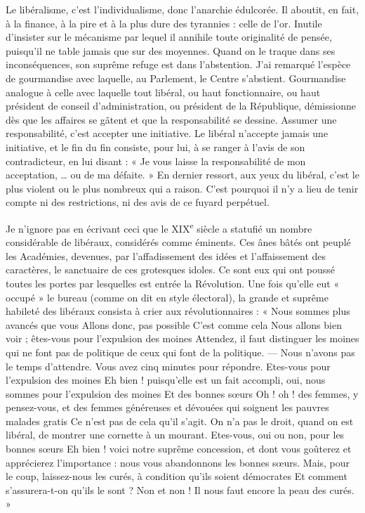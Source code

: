 \documentclass[french,twoside]{book} %
\begin{document}
Le libéralisme, c’est l’individualisme, donc l’anarchie édulcorée. Il aboutit, en fait, à la finance, à la pire et à la plus dure des tyrannies : celle de l’or. Inutile d’insister sur le mécanisme par lequel il annihile toute originalité de pensée, puisqu’il ne table jamais que sur des moyennes. Quand on le traque dans ses inconséquences, son suprême refuge est dans l’abstention. J’ai remarqué l’espèce de gourmandise avec laquelle, au Parlement, le Centre s’abstient. Gourmandise analogue à celle avec laquelle tout libéral, ou haut fonctionnaire, ou haut président de conseil d’administration, ou président de la République, démissionne dès que les affaires se gâtent et que la responsabilité se dessine. Assumer une responsabilité, c’est accepter une initiative. Le libéral n’accepte jamais une initiative, et le fin du fin consiste, pour lui, à se ranger à l’avis de son contradicteur, en lui disant : « Je vous laisse la responsabilité de mon acceptation, … ou de ma défaite. » En dernier ressort, aux yeux du libéral, c’est le plus violent ou le plus nombreux qui a raison. C’est pourquoi il n’y a lieu de tenir compte ni des restrictions, ni des avis de ce fuyard perpétuel.\par
Je n’ignore pas en écrivant ceci que le XIX\textsuperscript{e} siècle a statufié un nombre considérable de libéraux, considérés comme éminents. Ces ânes bâtés ont peuplé les Académies, devenues, par l’affadissement des idées et l’affaissement des caractères, le sanctuaire de ces grotesques idoles. Ce sont eux qui ont poussé toutes les portes par lesquelles est entrée la Révolution. Une fois qu’elle eut « occupé » le bureau (comme on dit en style électoral), la grande et suprême habileté des libéraux consista à crier aux révolutionnaires : « Nous sommes plus avancés que vous Allons donc, pas possible C’est comme cela Nous allons bien voir ; êtes-vous pour l’expulsion des moines Attendez, il faut distinguer les moines qui ne font pas de politique de ceux qui font de la politique. — Nous n’avons pas le temps d’attendre. Vous avez cinq minutes pour répondre. Etes-vous pour l’expulsion des moines Eh bien ! puisqu’elle est un fait accompli, oui, nous sommes pour l’expulsion des moines Et des bonnes sœurs Oh ! oh ! des femmes, y pensez-vous, et des femmes généreuses et dévouées qui soignent les pauvres malades gratis Ce n’est pas de cela qu’il s’agit. On n’a pas le droit, quand on est libéral, de montrer une cornette à un mourant. Etes-vous, oui ou non, pour les bonnes sœurs Eh bien ! voici notre suprême concession, et dont vous goûterez et apprécierez l’importance : nous vous abandonnons les bonnes sœurs. Mais, pour le coup, laissez-nous les curés, à condition qu’ils soient démocrates Et comment s’assurera-t-on qu’ils le sont ? Non et non ! Il nous faut encore la peau des curés. »\par
\end{document}
